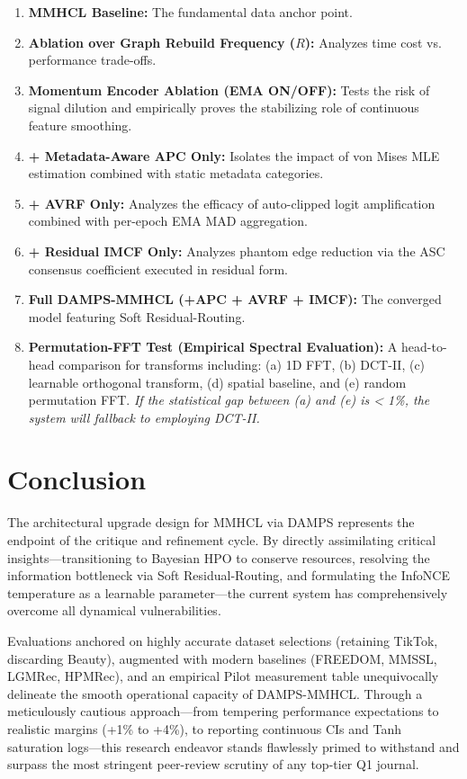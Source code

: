 \documentclass[12pt, a4paper]{article}
\begin{document}
\begin{enumerate}
    \item \textbf{MMHCL Baseline:} The fundamental data anchor point.
    \item \textbf{Ablation over Graph Rebuild Frequency ($R$):} Analyzes time cost vs. performance trade-offs.
    \item \textbf{Momentum Encoder Ablation (EMA ON/OFF):} Tests the risk of signal dilution and empirically proves the stabilizing role of continuous feature smoothing.
    \item \textbf{+ Metadata-Aware APC Only:} Isolates the impact of von Mises MLE estimation combined with static metadata categories.
    \item \textbf{+ AVRF Only:} Analyzes the efficacy of auto-clipped logit amplification combined with per-epoch EMA MAD aggregation.
    \item \textbf{+ Residual IMCF Only:} Analyzes phantom edge reduction via the ASC consensus coefficient executed in residual form.
    \item \textbf{Full DAMPS-MMHCL (+APC + AVRF + IMCF):} The converged model featuring Soft Residual-Routing.
    \item \textbf{Permutation-FFT Test (Empirical Spectral Evaluation):} A head-to-head comparison for transforms including: (a) 1D FFT, (b) DCT-II, (c) learnable orthogonal transform, (d) spatial baseline, and (e) random permutation FFT. \textit{If the statistical gap between (a) and (e) is < 1\%, the system will fallback to employing DCT-II.}
\end{enumerate}

\section{Conclusion}
The architectural upgrade design for MMHCL via DAMPS represents the endpoint of the critique and refinement cycle. By directly assimilating critical insights---transitioning to Bayesian HPO to conserve resources, resolving the information bottleneck via Soft Residual-Routing, and formulating the InfoNCE temperature as a learnable parameter---the current system has comprehensively overcome all dynamical vulnerabilities.

Evaluations anchored on highly accurate dataset selections (retaining TikTok, discarding Beauty), augmented with modern baselines (FREEDOM, MMSSL, LGMRec, HPMRec), and an empirical Pilot measurement table unequivocally delineate the smooth operational capacity of DAMPS-MMHCL. Through a meticulously cautious approach---from tempering performance expectations to realistic margins (+1\% to +4\%), to reporting continuous CIs and Tanh saturation logs---this research endeavor stands flawlessly primed to withstand and surpass the most stringent peer-review scrutiny of any top-tier Q1 journal.
\end{document}
